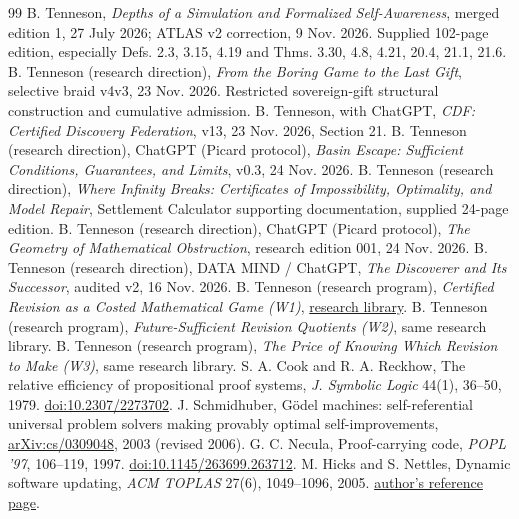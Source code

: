 \documentclass[11pt]{article}
\theoremstyle{remark}\newtheorem{remark}[theorem]{Remark}
\begin{document}
\begin{thebibliography}{99}\small
\setlength{\itemsep}{0pt}\setlength{\parsep}{0pt}
 B. Tenneson, \emph{Depths of a Simulation and Formalized Self-Awareness}, merged edition 1, 27 July 2026; ATLAS v2 correction, 9 Nov. 2026. Supplied 102-page edition, especially Defs. 2.3, 3.15, 4.19 and Thms. 3.30, 4.8, 4.21, 20.4, 21.1, 21.6.
 B. Tenneson (research direction), \emph{From the Boring Game to the Last Gift}, selective braid v4v3, 23 Nov. 2026. Restricted sovereign-gift structural construction and cumulative admission.
 B. Tenneson, with ChatGPT, \emph{CDF: Certified Discovery Federation}, v13, 23 Nov. 2026, Section 21.
 B. Tenneson (research direction), ChatGPT (Picard protocol), \emph{Basin Escape: Sufficient Conditions, Guarantees, and Limits}, v0.3, 24 Nov. 2026.
 B. Tenneson (research direction), \emph{Where Infinity Breaks: Certificates of Impossibility, Optimality, and Model Repair}, Settlement Calculator supporting documentation, supplied 24-page edition.
 B. Tenneson (research direction), ChatGPT (Picard protocol), \emph{The Geometry of Mathematical Obstruction}, research edition 001, 24 Nov. 2026.
 B. Tenneson (research direction), DATA MIND / ChatGPT, \emph{The Discoverer and Its Successor}, audited v2, 16 Nov. 2026.
 B. Tenneson (research program), \emph{Certified Revision as a Costed Mathematical Game (W1)}, \href{https://btenneson.github.io/Mathematics-of-certifiable-self-improvement/}{research library}.
 B. Tenneson (research program), \emph{Future-Sufficient Revision Quotients (W2)}, same research library.
 B. Tenneson (research program), \emph{The Price of Knowing Which Revision to Make (W3)}, same research library.
 S. A. Cook and R. A. Reckhow, The relative efficiency of propositional proof systems, \emph{J. Symbolic Logic} 44(1), 36--50, 1979. \href{https://doi.org/10.2307/2273702}{doi:10.2307/2273702}.
 J. Schmidhuber, G\"odel machines: self-referential universal problem solvers making provably optimal self-improvements, \href{https://arxiv.org/abs/cs/0309048}{arXiv:cs/0309048}, 2003 (revised 2006).
 G. C. Necula, Proof-carrying code, \emph{POPL '97}, 106--119, 1997. \href{https://doi.org/10.1145/263699.263712}{doi:10.1145/263699.263712}.
 M. Hicks and S. Nettles, Dynamic software updating, \emph{ACM TOPLAS} 27(6), 1049--1096, 2005. \href{https://www.cs.umd.edu/users/mwh/papers/HicksNettles03.html}{author's reference page}.

\end{thebibliography}
\end{document}
